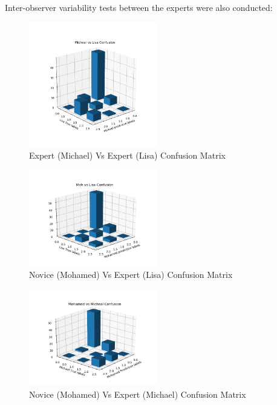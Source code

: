 \documentclass[a4paper]{article}
\begin{document}
        Inter-observer variability tests between the experts were also conducted:
        \begin{figure}[h!]
            \centerline{\includegraphics[width=0.5\textwidth]{../img/results/michVsLisa3d.PNG}}
            \label{figX: Expert Vs Expert Confusion Matrix} 
            \caption{Expert (Michael) Vs Expert (Lisa) Confusion Matrix}
        \end{figure}
        \begin{figure}[h!]
            \centerline{\includegraphics[width=0.5\textwidth]{../img/results/mohVsLisa3d.PNG}}
            \label{figX: Novice Vs Expert Confusion Matrix 1} 
            \caption{Novice (Mohamed) Vs Expert (Lisa) Confusion Matrix}
        \end{figure}
        \begin{figure}[h!]
            \centerline{\includegraphics[width=0.5\textwidth]{../img/results/mohVsMich3d.PNG}}
            \label{figX: Model Vs Novice Confusion Matrix 2} 
            \caption{Novice (Mohamed) Vs Expert (Michael) Confusion Matrix}
        \end{figure}
\end{document}
